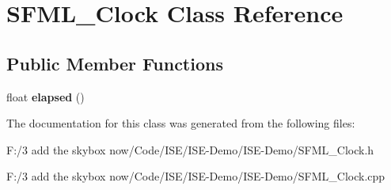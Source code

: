 \hypertarget{class_s_f_m_l___clock}{\section{S\-F\-M\-L\-\_\-\-Clock Class Reference}
\label{class_s_f_m_l___clock}
}
\subsection*{Public Member Functions}
\begin{DoxyCompactItemize}
\item 
\hypertarget{class_s_f_m_l___clock_a85bb772cc6c23340d7cc313a581602f4}{float {\bfseries elapsed} ()}\label{class_s_f_m_l___clock_a85bb772cc6c23340d7cc313a581602f4}

\end{DoxyCompactItemize}


The documentation for this class was generated from the following files\-:\begin{DoxyCompactItemize}
\item 
F\-:/3 add the skybox now/\-Code/\-I\-S\-E/\-I\-S\-E-\/\-Demo/\-I\-S\-E-\/\-Demo/S\-F\-M\-L\-\_\-\-Clock.\-h\item 
F\-:/3 add the skybox now/\-Code/\-I\-S\-E/\-I\-S\-E-\/\-Demo/\-I\-S\-E-\/\-Demo/S\-F\-M\-L\-\_\-\-Clock.\-cpp\end{DoxyCompactItemize}
